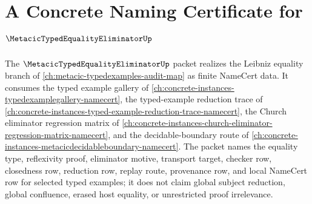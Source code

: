 \chapter{A Concrete Naming Certificate for $\MetacicTypedEqualityEliminatorUp$}
\label{ch:concrete-instances-metacic-typed-equality-eliminator-namecert}

The $\MetacicTypedEqualityEliminatorUp$ packet realizes the Leibniz equality branch of \autoref{ch:metacic-typedexamples-audit-map} as finite NameCert data. It consumes the typed example gallery of \autoref{ch:concrete-instances-typedexamplegallery-namecert}, the typed-example reduction trace of \autoref{ch:concrete-instances-typed-example-reduction-trace-namecert}, the Church eliminator regression matrix of \autoref{ch:concrete-instances-church-eliminator-regression-matrix-namecert}, and the decidable-boundary route of \autoref{ch:concrete-instances-metacicdecidableboundary-namecert}. The packet names the equality type, reflexivity proof, eliminator motive, transport target, checker row, closedness row, reduction row, replay route, provenance row, and local NameCert row for selected typed examples; it does not claim global subject reduction, global confluence, erased host equality, or unrestricted proof irrelevance.

